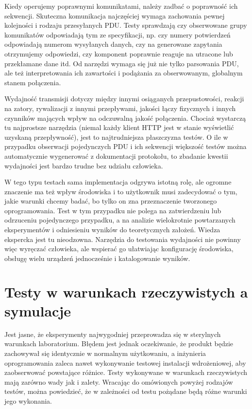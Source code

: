\documentclass[00-praca-magisterska.tex]{subfiles}
\begin{document}
Kiedy operujemy poprawnymi komunikatami, należy zadbać o poprawność ich
sekwencji. Skuteczna komunikacja najczęściej wymaga zachowania pewnej
kolejności i rodzaju przesyłanych PDU. Testy sprawdzają czy obserwowane grupy
komunikatów odpowiadają tym ze specyfikacji, np. czy numery potwierdzeń
odpowiadają numerom wysyłanych danych, czy na generowane zapytania otrzymujemy
odpowiedzi, czy komponent poprawnie reaguje na utracone lub przekłamane dane
itd. Od narzędzi wymaga się już nie tylko parsowania PDU, ale też
interpretowania ich zawartości i podążania za obserwowanym, globalnym stanem
połączenia.

Wydajność transmisji dotyczy między innymi osiąganych przepustowości, reakcji
na zatory, rywalizacji z innymi przepływami, jakości łączy fizycznych i innych
czynników mających wpływ na odczuwalną jakość połączenia. Chociaż wystarczą tu
najprostsze narzędzia (niemal każdy klient HTTP jest w stanie wyświetlić
uzyskaną przepływność), jest to najtrudniejsza płaszczyzna testów. O ile w
przypadku obserwacji pojedynczych PDU i ich sekwencji większość testów można
automatycznie wygenerować z dokumentacji protokołu, to zbadanie kwestii
wydajności jest bardzo trudne bez udziału człowieka.

W tego typu testach sama implementacja odgrywa istotną rolę, ale ogromne
znaczenie ma też wpływ środowiska i to użytkownik musi zadecydować o tym, jakie
warunki chcemy badać, bo tylko on zna przeznaczenie tworzonego oprogramowania.
Test w tym przypadku nie polega na zatwierdzeniu lub odrzuceniu pojedynczego
przypadku, a na analizie wielokrotnie powtarzanych eksperymentów i odniesieniu
wyników do teoretycznych założeń. Wiedza ekspercka jest tu nieodzowna.
Narzędzia do testowania wydajności nie powinny więc wyręczać człowieka, ale
wspierać go ułatwiając konfigurację środowiska, obsługę wielu urządzeń
jednocześnie i katalogowanie wyników.

\section{Testy w warunkach rzeczywistych a symulacje}
\label{testy-w-warunkach-rzeczywistych-a-symulacje}

Jest jasne, że eksperymenty najwygodniej przeprowadza się w sterylnych
warunkach laboratorium. Błędem jest jednak oczekiwanie, że produkt będzie
zachowywał się identycznie w normalnym użytkowaniu, a inżynieria oprogramowania
zaleca nawet wykonywanie testowej instalacji wdrożeniowej, aby zaobserwować
powstające różnice. Testy wykonywane w warunkach rzeczywistych mają zarówno
wady jak i zalety.  Wracając do omówionych powyżej rodzajów testów, można
powiedzieć, że w zależności od testu pożądane będą różne warunki jego
wykonania.
\end{document}
